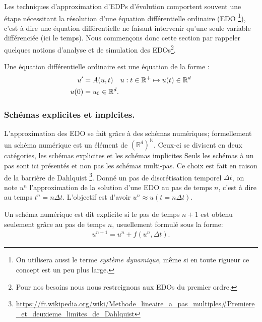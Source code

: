 Les techniques d'approximation d'EDPs d'évolution comportent souvent une étape nécessitant la résolution d'une équation différentielle ordinaire (EDO
\footnote{On utilisera aussi le terme \textit{système dynamique}, même si en toute rigueur ce concept est un peu plus large.}),
c'est à dire une équation différentielle ne faisant intervenir qu'une seule variable différenciée (ici le temps). Nous commençons donc cette section par rappeler 
quelques notions d'analyse et de simulation des EDOs\footnote{Pour nos besoins nous nous restreignons aux EDOs du premier ordre.}.\par

\begin{definition}
    Une équation différentielle ordinaire est une équation de la forme :
    \begin{align}\label{def:def_ODE}
        u' &= A(u,t)\quad u : t \in \mathbb{R}^+ \mapsto u(t) \in \mathbb{R}^d\\\notag
        u(0)&=u_0 \in \mathbb{R}^d.
    \end{align}
\end{definition}
\subsubsection{Schémas explicites et implcites.}
L'approximation des EDO se fait grâce à des schémas numériques; formellement un schéma numérique est un élément de $(\mathbb{R}^d)^\mathbb{N}$. 
Ceux-ci se divisent en deux catégories, les schémas explicites et les schémas implicites
Seuls les schémas à un pas sont ici présentés et non pas les schémas multi-pas. Ce choix est fait en raison de la barrière de Dahlquist
\footnote{\url{https://fr.wikipedia.org/wiki/Methode_lineaire_a_pas_multiples\#Premiere_et_deuxieme_limites_de_Dahlquist}}.
Donné un pas de discrétisation temporel $\Delta t$, on note $u^n$ l'approximation de la solution d'une EDO au pas de temps $n$, c'est à dire au temps $t^n = n \Delta t$.
L'objectif est d'avoir $u^n \approx u(t=n\Delta t)$.

\begin{definition}
    Un schéma numérique est dit explicite si le pas de temps $n+1$ est obtenu seulement grâce au pas de temps $n$, usuellement formulé sous la forme:
    \begin{align}
        u^{n+1} = u^n + f(u^n ,\Delta t ).
    \end{align}
\end{definition}

